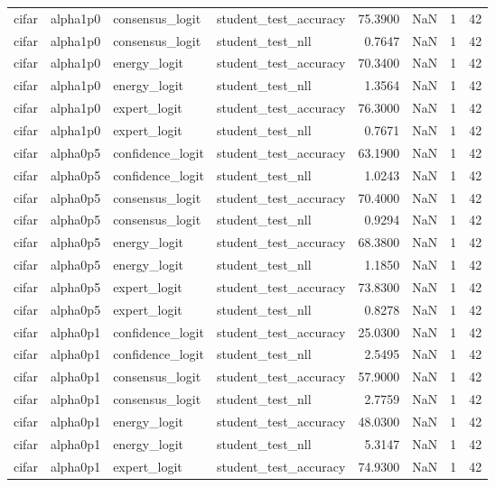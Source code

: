 \begin{tabular}{llllrrrl}
cifar & alpha1p0 & consensus\_logit & student\_test\_accuracy & 75.3900 & NaN & 1 & 42 \\
cifar & alpha1p0 & consensus\_logit & student\_test\_nll & 0.7647 & NaN & 1 & 42 \\
cifar & alpha1p0 & energy\_logit & student\_test\_accuracy & 70.3400 & NaN & 1 & 42 \\
cifar & alpha1p0 & energy\_logit & student\_test\_nll & 1.3564 & NaN & 1 & 42 \\
cifar & alpha1p0 & expert\_logit & student\_test\_accuracy & 76.3000 & NaN & 1 & 42 \\
cifar & alpha1p0 & expert\_logit & student\_test\_nll & 0.7671 & NaN & 1 & 42 \\
cifar & alpha0p5 & confidence\_logit & student\_test\_accuracy & 63.1900 & NaN & 1 & 42 \\
cifar & alpha0p5 & confidence\_logit & student\_test\_nll & 1.0243 & NaN & 1 & 42 \\
cifar & alpha0p5 & consensus\_logit & student\_test\_accuracy & 70.4000 & NaN & 1 & 42 \\
cifar & alpha0p5 & consensus\_logit & student\_test\_nll & 0.9294 & NaN & 1 & 42 \\
cifar & alpha0p5 & energy\_logit & student\_test\_accuracy & 68.3800 & NaN & 1 & 42 \\
cifar & alpha0p5 & energy\_logit & student\_test\_nll & 1.1850 & NaN & 1 & 42 \\
cifar & alpha0p5 & expert\_logit & student\_test\_accuracy & 73.8300 & NaN & 1 & 42 \\
cifar & alpha0p5 & expert\_logit & student\_test\_nll & 0.8278 & NaN & 1 & 42 \\
cifar & alpha0p1 & confidence\_logit & student\_test\_accuracy & 25.0300 & NaN & 1 & 42 \\
cifar & alpha0p1 & confidence\_logit & student\_test\_nll & 2.5495 & NaN & 1 & 42 \\
cifar & alpha0p1 & consensus\_logit & student\_test\_accuracy & 57.9000 & NaN & 1 & 42 \\
cifar & alpha0p1 & consensus\_logit & student\_test\_nll & 2.7759 & NaN & 1 & 42 \\
cifar & alpha0p1 & energy\_logit & student\_test\_accuracy & 48.0300 & NaN & 1 & 42 \\
cifar & alpha0p1 & energy\_logit & student\_test\_nll & 5.3147 & NaN & 1 & 42 \\
cifar & alpha0p1 & expert\_logit & student\_test\_accuracy & 74.9300 & NaN & 1 & 42 \\

\end{tabular}
